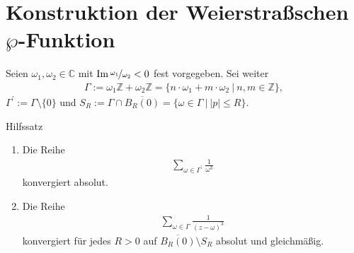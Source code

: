 \section{Konstruktion der Weierstraßschen $\wp$-Funktion }


Seien $\omega_1, \omega_2 \in \mathbb{C}$ mit $ \Im \nicefrac{\omega_1}{\omega_2}  < 0$  fest vorgegeben. 
Sei weiter
\begin{align*}
\Gamma  := \omega_1 \mathbb{Z} + \omega_2 \mathbb{Z}
= \lbrace n \cdot \omega_1 + m \cdot \omega_2 \ | \ n,m \in \mathbb{Z}  \rbrace, 
\end{align*}
$\Gamma^\prime := \Gamma \setminus \lbrace 0 \rbrace$ und 
$S_R := \Gamma \cap \overline{B_R(0)} = \lbrace \omega \in \Gamma \ | \ |p| \leq R \rbrace$.


\begin{bla}{Hilfssatz}\label{3.1}
\begin{enumerate}%
\item[\textbf{(1)}] 
Die Reihe
\begin{align*}
\sum \limits_{\omega \in \Gamma^\prime}  \frac{1}{\omega^3}
\end{align*}
konvergiert absolut. 
\item[\textbf{(2)})]
Die Reihe 
\begin{align*}
\sum \limits_{\omega \in \Gamma} \frac{1}{(z-\omega)^3}
\end{align*}
konvergiert für jedes $R>0$ auf $\overline{B_R(0)} \setminus S_R$ absolut und gleichmäßig.
\end{enumerate}
\end{bla}

